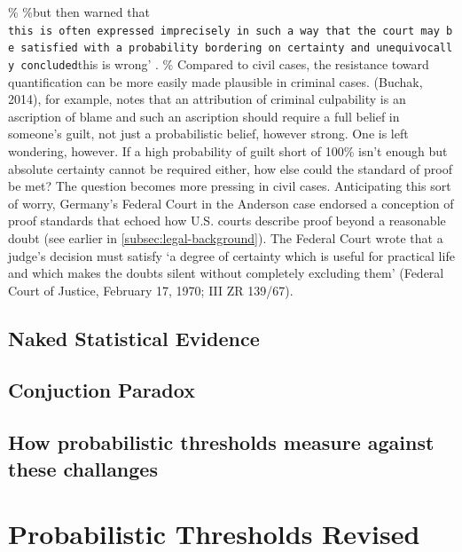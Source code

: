\documentclass[10pt,dvipsnames]{scrartcl}
\begin{document}
\% \%but then warned that
\texttt{this\ is\ often\ expressed\ imprecisely\ in\ such\ a\ way\ that\ the\ court\ may\ be\ satisfied\ with\ a\ probability\ bordering\ on\ certainty\textquotesingle{}\ and\ unequivocally\ concluded}this
is wrong' . \% Compared to civil cases, the resistance toward
quantification can be more easily made plausible in criminal cases.
(Buchak, 2014), for example, notes that an attribution of criminal
culpability is an ascription of blame and such an ascription should
require a full belief in someone's guilt, not just a probabilistic
belief, however strong. One is left wondering, however. If a high
probability of guilt short of 100\% isn't enough but absolute certainty
cannot be required either, how else could the standard of proof be met?
The question becomes more pressing in civil cases. Anticipating this
sort of worry, Germany's Federal Court in the Anderson case endorsed a
conception of proof standards that echoed how U.S. courts describe proof
beyond a reasonable doubt (see earlier in
\ref{subsec:legal-background}). The Federal Court wrote that a judge's
decision must satisfy `a degree of certainty which is useful for
practical life and which makes the doubts silent without completely
excluding them' (Federal Court of Justice, February 17, 1970; III ZR
139/67).

\hypertarget{naked-statistical-evidence}{%
\subsection{Naked Statistical
Evidence}\label{naked-statistical-evidence}}

\hypertarget{conjuction-paradox}{%
\subsection{Conjuction Paradox}\label{conjuction-paradox}}

\hypertarget{how-probabilistic-thresholds-measure-against-these-challanges}{%
\subsection{How probabilistic thresholds measure against these
challanges}\label{how-probabilistic-thresholds-measure-against-these-challanges}}

\hypertarget{probabilistic-thresholds-revised}{%
\section{Probabilistic Thresholds
Revised}\label{probabilistic-thresholds-revised}}
\end{document}
